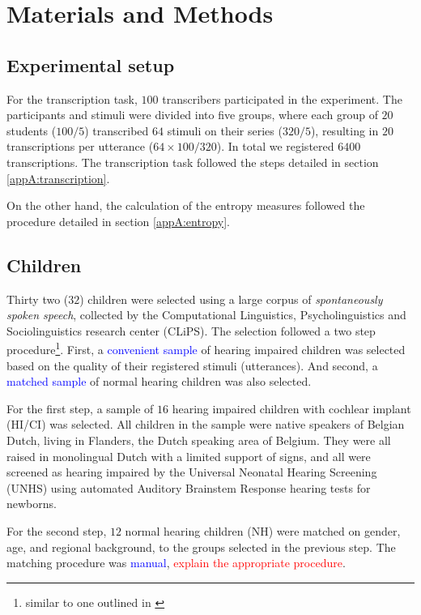 \section{Materials and Methods}
%
\subsection{Experimental setup}
%
For the transcription task, $100$ transcribers participated in the experiment. The participants and stimuli were divided into five groups, where each group of $20$ students ($100/5$) transcribed $64$ stimuli on their series ($320/5$), resulting in $20$ transcriptions per utterance ($64 \times 100 / 320$). In total we registered $6400$ transcriptions. The transcription task followed the steps detailed in section \ref{appA:transcription}. 

On the other hand, the calculation of the entropy measures followed the procedure detailed in section \ref{appA:entropy}.
%
\subsection{Children}
%
Thirty two ($32$) children were selected using a large corpus of \textit{spontaneously spoken speech}, collected by the Computational Linguistics, Psycholinguistics and Sociolinguistics research center (CLiPS). The selection followed a two step procedure\footnote{similar to one outlined in \citet{Faes_et_al_2021}}. First, a \textcolor{blue}{convenient sample} of hearing impaired children was selected based on the quality of their registered stimuli (utterances). And second, a \textcolor{blue}{matched sample} of normal hearing children was also selected.

For the first step, a sample of $16$ hearing impaired children with cochlear implant (HI/CI) was selected. All children in the sample were native speakers of Belgian Dutch, living in Flanders, the Dutch speaking area of Belgium. They were all raised in monolingual Dutch with a limited support of signs, and all were screened as hearing impaired by the Universal Neonatal Hearing Screening (UNHS) using automated Auditory Brainstem Response hearing tests for newborns. 

For the second step, $12$ normal hearing children (NH) were matched on gender, age, and regional background, to the groups selected in the previous step. The matching procedure was \textcolor{blue}{manual}, \textcolor{red}{explain the appropriate procedure}.

